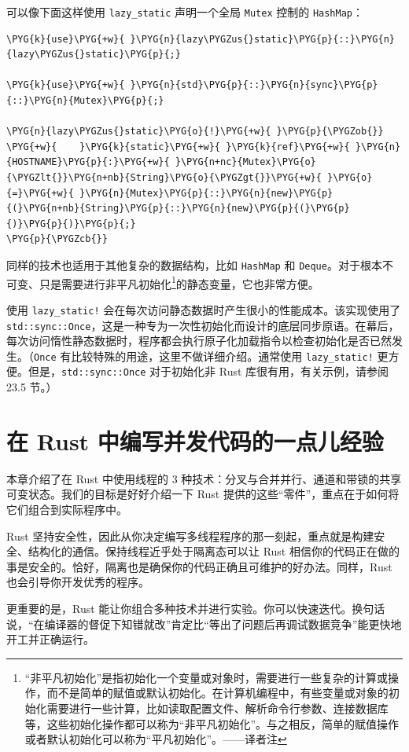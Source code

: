 可以像下面这样使用 \texttt{lazy\_static} 声明一个全局 \texttt{Mutex} 控制的 \texttt{HashMap}：

\begin{Verbatim}[commandchars=\\\{\},breaklines=true,breakanywhere=true,fontsize=\codefont,xleftmargin=17bp]
\PYG{k}{use}\PYG{+w}{ }\PYG{n}{lazy\PYGZus{}static}\PYG{p}{::}\PYG{n}{lazy\PYGZus{}static}\PYG{p}{;}

\PYG{k}{use}\PYG{+w}{ }\PYG{n}{std}\PYG{p}{::}\PYG{n}{sync}\PYG{p}{::}\PYG{n}{Mutex}\PYG{p}{;}

\PYG{n}{lazy\PYGZus{}static}\PYG{o}{!}\PYG{+w}{ }\PYG{p}{\PYGZob{}}
\PYG{+w}{    }\PYG{k}{static}\PYG{+w}{ }\PYG{k}{ref}\PYG{+w}{ }\PYG{n}{HOSTNAME}\PYG{p}{:}\PYG{+w}{ }\PYG{n+nc}{Mutex}\PYG{o}{\PYGZlt{}}\PYG{n+nb}{String}\PYG{o}{\PYGZgt{}}\PYG{+w}{ }\PYG{o}{=}\PYG{+w}{ }\PYG{n}{Mutex}\PYG{p}{::}\PYG{n}{new}\PYG{p}{(}\PYG{n+nb}{String}\PYG{p}{::}\PYG{n}{new}\PYG{p}{(}\PYG{p}{)}\PYG{p}{)}\PYG{p}{;}
\PYG{p}{\PYGZcb{}}
\end{Verbatim}

同样的技术也适用于其他复杂的数据结构，比如 \texttt{HashMap} 和 \texttt{Deque}。对于根本不可变、只是需要进行非平凡初始化\footnote{“非平凡初始化”是指初始化一个变量或对象时，需要进行一些复杂的计算或操作，而不是简单的赋值或默认初始化。在计算机编程中，有些变量或对象的初始化需要进行一些计算，比如读取配置文件、解析命令行参数、连接数据库等，这些初始化操作都可以称为“非平凡初始化”。与之相反，简单的赋值操作或者默认初始化可以称为“平凡初始化”。——译者注}的静态变量，它也非常方便。

使用 \texttt{lazy\_static!} 会在每次访问静态数据时产生很小的性能成本。该实现使用了 \texttt{std::sync::Once}，这是一种专为一次性初始化而设计的底层同步原语。在幕后，每次访问惰性静态数据时，程序都会执行原子化加载指令以检查初始化是否已然发生。（\texttt{Once} 有比较特殊的用途，这里不做详细介绍。通常使用 \texttt{lazy\_static!} 更方便。但是，\texttt{std::sync::Once} 对于初始化非 Rust 库很有用，有关示例，请参阅 23.5 节。）

\section{在 Rust 中编写并发代码的一点儿经验}

本章介绍了在 Rust 中使用线程的 3 种技术：分叉与合并并行、通道和带锁的共享可变状态。我们的目标是好好介绍一下 Rust 提供的这些“零件”，重点在于如何将它们组合到实际程序中。

Rust 坚持安全性，因此从你决定编写多线程程序的那一刻起，重点就是构建安全、结构化的通信。保持线程近乎处于隔离态可以让 Rust 相信你的代码正在做的事是安全的。恰好，隔离也是确保你的代码正确且可维护的好办法。同样，Rust 也会引导你开发优秀的程序。

更重要的是，Rust 能让你组合多种技术并进行实验。你可以快速迭代。换句话说，“在编译器的督促下知错就改”肯定比“等出了问题后再调试数据竞争”能更快地开工并正确运行。

